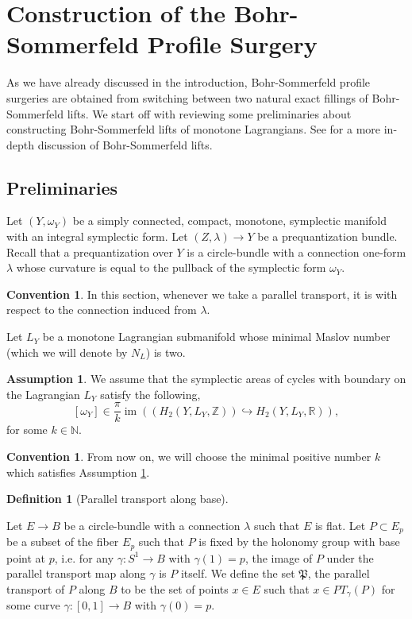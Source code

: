 \documentclass[11pt, oneside,dvipsnames]{amsart}
\renewcommand{\to}{\rightarrow}
\newcommand{\sub}{\subset}
\renewcommand{\to}{\rightarrow}
\newcommand{\<}{\langle}
\renewcommand{\>}{\rangle}
\DeclareMathOperator{\im}{im}
\newcommand{\bN}{\mathbb{N}}
\newcommand{\bR}{\mathbb{R}}
\newcommand{\bZ}{\mathbb{Z}}
\renewcommand{\to}{\rightarrow}
\theoremstyle{definition}
\newtheorem{assum}[Theorem]{Assumption}
\newtheorem{conv}[Theorem]{Convention}
\theoremstyle{definition}
\newtheorem{defn}[Theorem]{Definition}
\numberwithin{equation}{subsection}
\begin{document}
\section{Construction of the Bohr-Sommerfeld Profile Surgery}\label{sec:Constr}

As we have already discussed in the introduction, Bohr-Sommerfeld profile surgeries are obtained from switching between two natural exact fillings of Bohr-Sommerfeld lifts. We start off with reviewing some preliminaries about constructing Bohr-Sommerfeld lifts of monotone Lagrangians. See \cite[\S~4]{rg19} for a more in-depth discussion of Bohr-Sommerfeld lifts.


\subsection{Preliminaries}\label{sub:prelim}

Let $(Y,\omega_Y)$ be a simply connected, compact, monotone, symplectic manifold with an integral symplectic form. Let $(Z,\lambda) \to Y$ be a prequantization bundle. Recall that a prequantization over $Y$ is a circle-bundle with a connection one-form $\lambda$ whose curvature is equal to the pullback of the symplectic form $\omega_Y$. 


\begin{conv}
    In this section, whenever we take a parallel transport, it is with respect to the connection induced from $\lambda$.
\end{conv}

Let $L_Y$ be a monotone Lagrangian submanifold whose minimal Maslov number (which we will denote by $N_L$) is two.  
\begin{assum}\label{as1} We assume that the symplectic areas of cycles with boundary on the Lagrangian $L_Y$ satisfy the following,     
    $$[\omega_Y] \in \frac{\pi}{k} \im((H_2(Y,L_Y,\bZ)) \hookrightarrow H_2(Y,L_Y,\bR)),$$ for some $k\in \bN$. 
\end{assum}


\begin{conv}
   From now on, we will choose the minimal positive number $k$ which satisfies Assumption \ref{as1}.
\end{conv}


\begin{defn}[Parallel transport along  base]\label{def:pll}

Let  $E \to B$ be a circle-bundle with a connection $\lambda$ such that $E$ is flat. Let $P\sub E_p$ be a subset of the fiber $E_p$ such that $P$ is fixed by the holonomy group with base point at $p$, i.e. for any $\gamma:S^1 \to B$ with $\gamma(1)=p$,  the image of $P$ under the parallel transport map along $\gamma$ is $P$ itself. We define the set $\mathfrak{P}$, the parallel transport of $P$ along $B$ to be the set of points $x\in E$ such that $x\in PT_\gamma(P)$ for some curve $\gamma:[0,1] \to B$ with $\gamma(0)=p$.
\end{defn}
\end{document}
